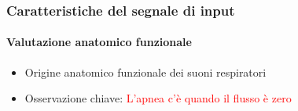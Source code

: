 
% 
% 
% 
% 
% 





\begin{frame}
  \frametitle{Caratteristiche del segnale di input}
  \framesubtitle{Valutazione anatomico funzionale}
  \begin{itemize}
    \item Origine anatomico funzionale dei suoni respiratori
    \item Osservazione chiave:
      \textcolor{red}{L'apnea c'\`e quando il flusso \`e zero}
  \end{itemize}
\end{frame}


